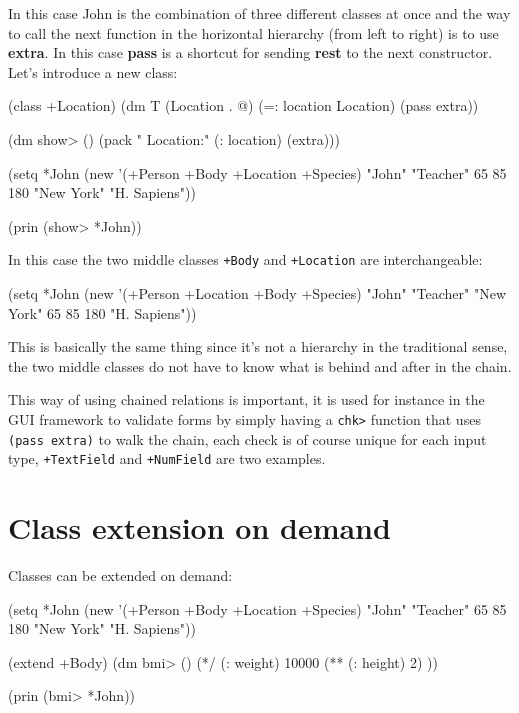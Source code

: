 In this case John is the combination of three different classes at once
and the way to call the next function in the horizontal hierarchy (from
left to right) is to use \textbf{extra}. In this case \textbf{pass} is a shortcut for
sending \textbf{rest} to the next constructor. Let's introduce a new class:


\begin{wideverbatim}
(class +Location)
(dm T (Location . @)
    (=: location Location)
    (pass extra))

(dm show> ()
    (pack " Location:" (: location) (extra)))
    
(setq *John (new '(+Person +Body +Location +Species)
 "John" "Teacher" 65 85 180 "New York" "H. Sapiens"))

(prin (show> *John))
\end{wideverbatim}

In this case the two middle classes \texttt{+Body} and
\texttt{+Location} are interchangeable:


\begin{wideverbatim}
(setq *John (new '(+Person +Location +Body +Species)
 "John" "Teacher" "New York" 65 85 180 "H. Sapiens"))
\end{wideverbatim}

This is basically the same thing since it's not a hierarchy in the
traditional sense, the two middle classes do not have to know what is
behind and after in the chain.

This way of using chained relations is important, it is used for
instance in the GUI framework to validate forms by simply having a
\texttt{chk>} function that uses \texttt{(pass extra)} to walk the
chain, each check is of course unique for each input type,
\texttt{+TextField} and \texttt{+NumField} are two examples.


\section{Class extension on demand}
\label{sec:more-oo}

Classes can be extended on demand:

\begin{wideverbatim}
(setq *John (new '(+Person +Body +Location +Species) 
"John" "Teacher" 65 85 180 "New York" "H. Sapiens"))

(extend +Body)
(dm bmi> ()
    (*/ (: weight) 10000 (** (: height) 2) ))

(prin (bmi> *John))
\end{wideverbatim}

